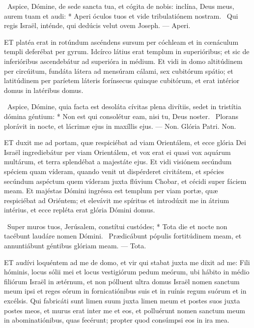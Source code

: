 \R\ Aspice, Dómine, de sede sancta tua, et cógita de nobis: inclína, Deus meus, aurem tuam et audi: * Aperi óculos tuos et vide tribulatiónem nostram. \V\ Qui regis Israël, inténde, qui dedúcis velut ovem Joseph. — Aperi.



\lettrine[lines=2]{E}{T} platéa erat in rotúndum ascéndens sursum per cóchleam et in cœnáculum templi deferébat per gyrum. Idcírco látius erat templum in superióribus; et sic de inferióribus ascendebátur ad superióra in médium. Et vidi in domo altitúdinem per circúitum, fundáta látera ad mensúram cálami, sex cubitórum spátio; et latitúdinem per paríetem láteris forínsecus quinque cubitórum, et erat intérior domus in latéribus domus.

\R\ Aspice, Dómine, quia facta est desoláta cívitas plena divítiis, sedet in tristítia dómina géntium: * Non est qui consolétur eam, nisi tu, Deus noster. \V\ Plorans plorávit in nocte, et lácrimæ ejus in maxíllis ejus. — Non. Glória Patri. Non.




\lettrine[lines=2]{E}{T} duxit me ad portam, quæ respiciébat ad viam Orientálem, et ecce glória Dei Israël ingrediebátur per viam Orientálem, et vox erat ei quasi vox aquárum multárum, et terra splendébat a majestáte ejus. Et vidi visiónem secúndum spéciem quam víderam, quando venit ut dispérderet civitátem, et spécies secúndum aspéctum quem víderam juxta flúvium Chobar, et cécidi super fáciem meam. Et majéstas Dómini ingréssa est templum per viam portæ, quæ respiciébat ad Oriéntem; et elevávit me spíritus et introdúxit me in átrium intérius, et ecce repléta erat glória Dómini domus.

\R\ Super muros tuos, Jerúsalem, constítui custódes; * Tota die et nocte non tacébunt laudáre nomen Dómini. \V\ Prædicábunt pópulis fortitúdinem meam, et annuntiábunt géntibus glóriam meam. — Tota.


\lettrine[lines=2]{E}{T} audívi loquéntem ad me de domo, et vir qui stabat juxta me dixit ad me: Fili hóminis, locus sólii mei et locus vestigiórum pedum meórum, ubi hábito in médio filiórum Israël in ætérnum, et non pólluent ultra domus Israël nomen sanctum meum ipsi et reges eórum in fornicatiónibus suis et in ruínis regum suórum et in excélsis. Qui fabricáti sunt limen suum juxta limen meum et postes suos juxta postes meos, et murus erat inter me et eos, et polluérunt nomen sanctum meum in abominatiónibus, quas fecérunt; propter quod consúmpsi eos in ira mea.


